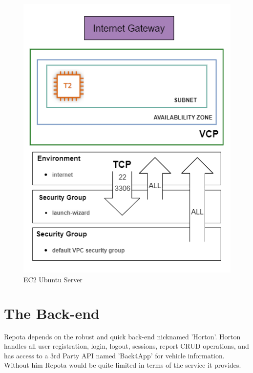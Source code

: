 \begin{figure}[H]
    \caption{EC2 Ubuntu Server}
    \label{image:db_aws}
    \centering
    \includegraphics[width=1.0\textwidth]{images/aws/aws_linux.png}
\end{figure}

\newpage
\section{The Back-end}
Repota depends on the robust and quick back-end nicknamed 'Horton'. 
Horton handles all user registration, login, logout, sessions, report CRUD operations, and has access to a 3rd Party API named 'Back4App' for vehicle information. Without him Repota would be quite limited in terms of the service it provides. 

